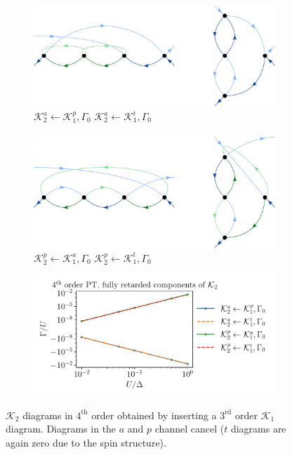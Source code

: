 \documentclass[10pt]{scrartcl}
\newcommand{\Ktot}[1]{\mathcal{K}_#1}
\newcommand{\K}[2]{\mathcal{K}_#1^#2}
\begin{document}
\begin{figure}[h!]
\begin{subfigure}[c]{0.4\textwidth}
\includegraphics[scale=0.3]{diagrams/PT4_K2a_1}
\\
\phantom{.}\hspace{0.45cm} $\K2a \leftarrow \K1p, \Gamma_0$ \hspace{1cm} $\K2a \leftarrow \K1t, \Gamma_0$
\\ \\
\includegraphics[scale=0.3]{diagrams/PT4_K2p_1}
\\
\phantom{.}\hspace{0.45cm} $\K2p \leftarrow \K1a, \Gamma_0$ \hspace{1cm} $\K2p \leftarrow \K1t, \Gamma_0$
\end{subfigure}
\begin{subfigure}[c]{0.4\textwidth}
\includegraphics[scale=0.65]{plots/PT4_K2_1}
\end{subfigure}
\caption{$\Ktot2$ diagrams in $4^\text{th}$ order obtained by inserting a $3^\text{rd}$ order $\Ktot1$ diagram. Diagrams in the $a$ and $p$ channel cancel ($t$ diagrams are again zero due to the spin structure).}
\end{figure}
\end{document}
